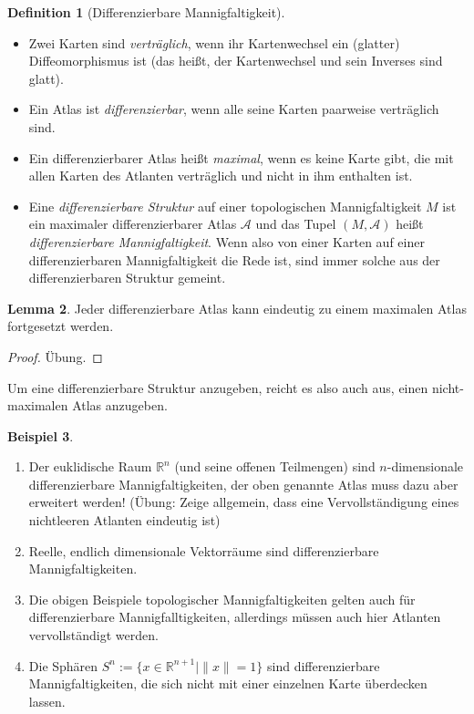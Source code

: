 \documentclass[a4paper]{scrreprt}
\numberwithin{equation}{chapter}
\newcommand{\R}{\mathbb{R}}
\theoremstyle{definition}
\newtheorem{defn}{Definition}[section]
\newtheorem{lemma}[defn]{Lemma}
\newtheorem{bsp}[defn]{Beispiel}
\newcommand{\bewUeb}{\begin{proof}Übung.\end{proof}}
\begin{document}
		\begin{defn}[Differenzierbare Mannigfaltigkeit]\hfill
			\begin{itemize}
				\item Zwei Karten sind \emph{verträglich}, wenn ihr Kartenwechsel ein (glatter) Diffeomorphismus ist (das heißt, der Kartenwechsel und sein Inverses sind glatt).
				\item Ein Atlas ist \emph{differenzierbar}, wenn alle seine Karten paarweise verträglich sind.
				\item Ein differenzierbarer Atlas heißt \emph{maximal}, wenn es keine Karte gibt, die mit allen Karten des Atlanten verträglich und nicht in ihm enthalten ist.
				\item Eine \emph{differenzierbare Struktur} auf einer topologischen Mannigfaltigkeit $M$ ist ein maximaler differenzierbarer Atlas $\mathcal{A}$ und das Tupel $(M,\mathcal{A})$ heißt \emph{differenzierbare Mannigfaltigkeit}. Wenn also von einer Karten auf einer differenzierbaren Mannigfaltigkeit die Rede ist, sind immer solche aus der differenzierbaren Struktur gemeint.
			\end{itemize}
		\end{defn}
		\begin{lemma}
			Jeder differenzierbare Atlas kann eindeutig zu einem maximalen Atlas fortgesetzt werden. \bewUeb
		\end{lemma}
		Um eine differenzierbare Struktur anzugeben, reicht es also auch aus, einen nicht-maximalen Atlas anzugeben.
		\begin{bsp}\hfill 
			\begin{enumerate}
				\item Der euklidische Raum $\R^n$ (und seine offenen Teilmengen) sind $n$-dimensionale differenzierbare Mannigfaltigkeiten, der oben genannte Atlas muss dazu aber erweitert werden! (Übung: Zeige allgemein, dass eine Vervollständigung eines nichtleeren Atlanten eindeutig ist)
				\item Reelle, endlich dimensionale Vektorräume sind differenzierbare Mannigfaltigkeiten.
				\item Die obigen Beispiele topologischer Mannigfaltigkeiten gelten auch für differenzierbare Mannigfalltigkeiten, allerdings müssen auch hier Atlanten vervollständigt werden.
				\item Die Sphären ${S^n:=\lbrace x\in\R^{n+1}\mid \|x\|=1\rbrace}$ sind differenzierbare Mannigfaltigkeiten, die sich nicht mit einer einzelnen Karte überdecken lassen.
			\end{enumerate}
		\end{bsp}
\end{document}
